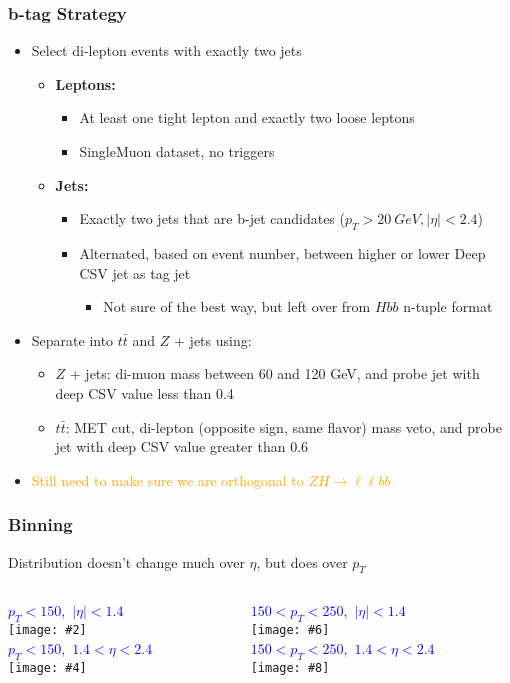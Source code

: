 \documentclass{beamer}
\newcommand{\fourfigs}[8]{
  \begin{columns}
    \begin{column}{0.3\linewidth}
      \centering
      \textcolor{blue}{#1} \\
      \texttt{[image: \#2]} \\
      \textcolor{blue}{#3} \\
      \texttt{[image: \#4]}
    \end{column}
    \begin{column}{0.3\linewidth}
      \centering
      \textcolor{blue}{#5} \\
      \texttt{[image: \#6]} \\
      \textcolor{blue}{#7} \\
      \texttt{[image: \#8]}
    \end{column}
  \end{columns}
}
\newcommand{\ttbar}{\ensuremath{t\bar{t}}}
\begin{document}
\begin{frame}
  \frametitle{b-tag Strategy}

  \begin{itemize}
  \item Select di-lepton events with exactly two jets
    \begin{itemize}
    \item {\bf Leptons:}
      \begin{itemize}
      \item At least one tight lepton and exactly two loose leptons
      \item SingleMuon dataset, no triggers
      \end{itemize}
    \item {\bf Jets:}
      \begin{itemize}
      \item Exactly two jets that are b-jet candidates ($p_T > \SI{20}{GeV}, |\eta| < 2.4$)
      \item Alternated, based on event number,
        between higher or lower Deep CSV jet as tag jet
        \begin{itemize}
        \item Not sure of the best way, but left over from $Hbb$ n-tuple format
        \end{itemize}
      \end{itemize}
    \end{itemize}
  \item Separate into $\ttbar$ and $Z$ + jets using:
    \begin{itemize}
    \item {$Z$ + jets:} di-muon mass between 60 and 120 GeV, and
      probe jet with deep CSV value less than 0.4
    \item {$\ttbar$:} MET cut, di-lepton (opposite sign, same flavor) mass veto, and
      probe jet with deep CSV value greater than 0.6
    \end{itemize}
  \item \textcolor{orange}{Still need to make sure we are orthogonal to
    $ZH \rightarrow \ell\ell bb$}
  \end{itemize}

\end{frame}

\begin{frame}
  \frametitle{Binning}

  Distribution doesn't change much over $\eta$, but does over $p_T$

  \fourfigs{\mbox{$p_T < 150$, $|\eta| < 1.4$}}
           {190214_tnp_bjets/light_pt_0_150_eta_0_1p4_probe_deepCSVb.pdf}
           {\mbox{$p_T < 150$, $1.4 < \eta < 2.4$}}
           {190214_tnp_bjets/light_pt_0_150_eta_1p4_2p5_probe_deepCSVb.pdf}
           {\mbox{$150 < p_T < 250$, $|\eta| < 1.4$}}
           {190214_tnp_bjets/light_pt_150_250_eta_0_1p4_probe_deepCSVb.pdf}
           {\mbox{$150 < p_T < 250$, $1.4 < \eta < 2.4$}}
           {190214_tnp_bjets/light_pt_150_250_eta_1p4_2p5_probe_deepCSVb.pdf}
           
\end{frame}
\end{document}
